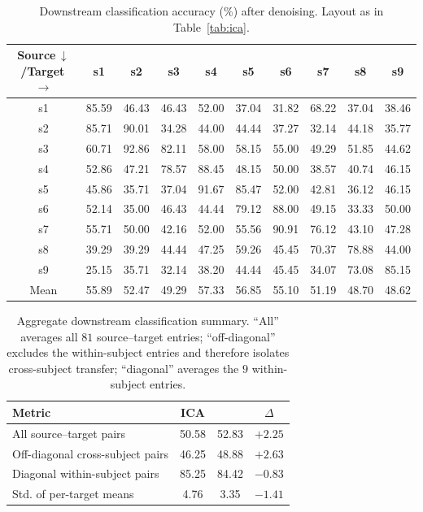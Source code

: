 \begin{table}[t]
  \caption{Downstream classification accuracy (\%) after \saddpm{} denoising.
  Layout as in Table~\ref{tab:ica}.}
  \label{tab:saddpm}
  \footnotesize
  \setlength{\tabcolsep}{4.2pt}
  \begin{tabular}{c*{9}{c}}
    \toprule
    Source\,$\downarrow$\;/\;Target\,$\rightarrow$ & s1 & s2 & s3 & s4 & s5 & s6 & s7 & s8 & s9 \\
    \midrule
    s1 & 85.59 & 46.43 & 46.43 & 52.00 & 37.04 & 31.82 & 68.22 & 37.04 & 38.46 \\
    s2 & 85.71 & 90.01 & 34.28 & 44.00 & 44.44 & 37.27 & 32.14 & 44.18 & 35.77 \\
    s3 & 60.71 & 92.86 & 82.11 & 58.00 & 58.15 & 55.00 & 49.29 & 51.85 & 44.62 \\
    s4 & 52.86 & 47.21 & 78.57 & 88.45 & 48.15 & 50.00 & 38.57 & 40.74 & 46.15 \\
    s5 & 45.86 & 35.71 & 37.04 & 91.67 & 85.47 & 52.00 & 42.81 & 36.12 & 46.15 \\
    s6 & 52.14 & 35.00 & 46.43 & 44.44 & 79.12 & 88.00 & 49.15 & 33.33 & 50.00 \\
    s7 & 55.71 & 50.00 & 42.16 & 52.00 & 55.56 & 90.91 & 76.12 & 43.10 & 47.28 \\
    s8 & 39.29 & 39.29 & 44.44 & 47.25 & 59.26 & 45.45 & 70.37 & 78.88 & 44.00 \\
    s9 & 25.15 & 35.71 & 32.14 & 38.20 & 44.44 & 45.45 & 34.07 & 73.08 & 85.15 \\
    \midrule
    Mean & 55.89 & 52.47 & 49.29 & 57.33 & 56.85 & 55.10 & 51.19 & 48.70 & 48.62 \\
    \bottomrule
  \end{tabular}
\end{table}

\begin{table}[t]
  \caption{Aggregate downstream classification summary. ``All'' averages all
  $81$ source--target entries; ``off-diagonal'' excludes the within-subject
  entries and therefore isolates cross-subject transfer; ``diagonal'' averages
  the $9$ within-subject entries.}
  \label{tab:acc_summary}
  \small
  \begin{tabular}{lccc}
    \toprule
    Metric & ICA & \saddpm{} & $\Delta$ \\
    \midrule
    All source--target pairs & 50.58 & 52.83 & $+2.25$ \\
    Off-diagonal cross-subject pairs & 46.25 & 48.88 & $+2.63$ \\
    Diagonal within-subject pairs & 85.25 & 84.42 & $-0.83$ \\
    Std. of per-target means & 4.76 & 3.35 & $-1.41$ \\
    \bottomrule
  \end{tabular}
\end{table}

